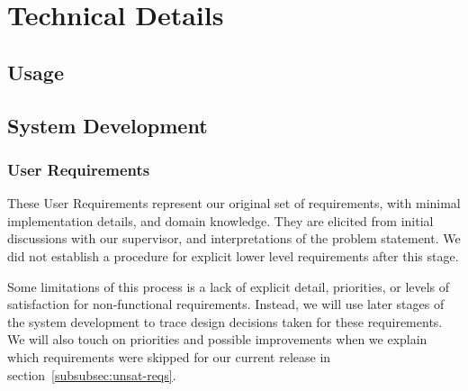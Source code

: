 \documentclass[11pt]{article}
\begin{document}
    \section{Technical Details}\label{sec:technical-details}
    \subsection{Usage}\label{subsec:usage}

    \subsection{System Development}

    \label{subsec:system-development}
    \subsubsection{User Requirements}\label{subsubsec:user-reqs}

    These User Requirements represent our original set of requirements, with minimal implementation details, and domain knowledge.
    They are elicited from initial discussions with our supervisor,
    and interpretations of the problem statement.
    We did not establish a procedure for explicit lower level requirements after this stage.

    Some limitations of this process is a lack of explicit detail, priorities, or levels of satisfaction for non-functional requirements.
    Instead, we will use later stages of the system development to trace design decisions taken for these requirements.
    We will also touch on priorities and possible improvements when we explain
    which requirements were skipped for our current release in section~\ref{subsubsec:unsat-reqs}.
\end{document}
